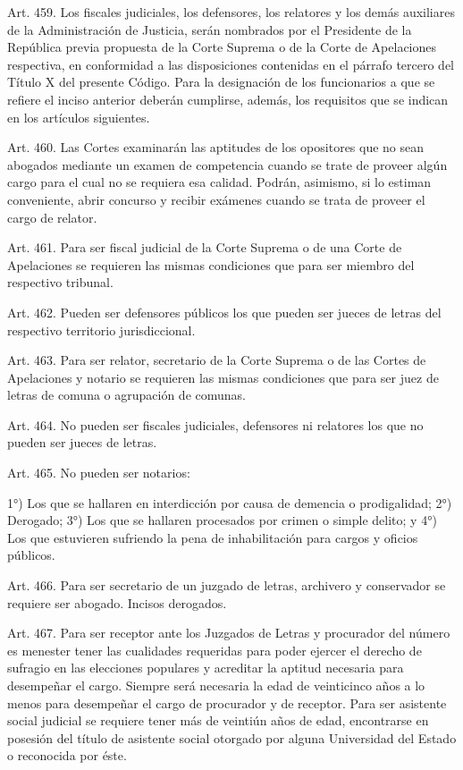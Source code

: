     Art. 459. Los fiscales judiciales, los defensores, los relatores y los demás auxiliares de la Administración de Justicia, serán nombrados por el Presidente de la República previa propuesta de la Corte Suprema o de la Corte de Apelaciones respectiva, en conformidad a las disposiciones contenidas en el párrafo tercero del Título X del presente Código.
    Para la designación de los funcionarios a que se refiere el inciso anterior deberán cumplirse, además, los requisitos que se indican en los artículos siguientes.



    Art. 460. Las Cortes examinarán las aptitudes de los opositores que no sean abogados mediante un examen de competencia cuando se trate de proveer algún cargo para el cual no se requiera esa calidad.
    Podrán, asimismo, si lo estiman conveniente, abrir concurso y recibir exámenes cuando se trata de proveer el cargo de relator.


    Art. 461. Para ser fiscal judicial de la Corte Suprema o de una Corte de Apelaciones se requieren las mismas condiciones que para ser miembro del respectivo tribunal.


    Art. 462. Pueden ser defensores públicos los que pueden ser jueces de letras del respectivo territorio jurisdiccional.


    Art. 463. Para ser relator, secretario de la Corte Suprema o de las Cortes de Apelaciones y notario se requieren las mismas condiciones que para ser juez de letras de comuna o agrupación de comunas.






    Art. 464. No pueden ser fiscales judiciales, defensores ni relatores los que no pueden ser jueces de letras.


    Art. 465. No pueden ser notarios:

    1°) Los que se hallaren en interdicción por causa de demencia o prodigalidad;
    2°) Derogado;
    3°) Los que se hallaren procesados por crimen o simple delito; y
    4°) Los que estuvieren sufriendo la pena de inhabilitación para cargos y oficios públicos.


    Art. 466. Para ser secretario de un juzgado de letras, archivero y conservador se requiere ser abogado.
    Incisos derogados.



    Art. 467. Para ser receptor ante los Juzgados de Letras y procurador del número es menester tener las cualidades requeridas para poder ejercer el derecho de sufragio en las elecciones populares y acreditar la aptitud necesaria para desempeñar el cargo. Siempre será necesaria la edad de veinticinco años a lo menos para desempeñar el cargo de procurador y de receptor.
    Para ser asistente social judicial se requiere tener más de veintiún años de edad, encontrarse en posesión del título de asistente social otorgado por alguna Universidad del Estado o reconocida por éste.


